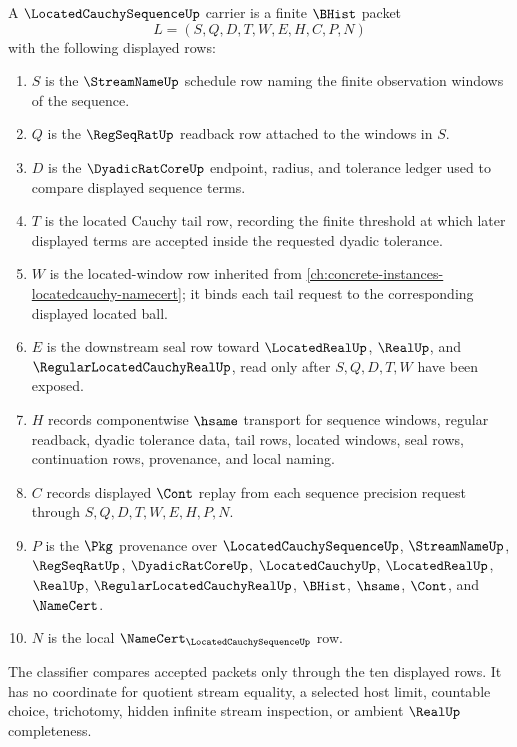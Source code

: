 \begin{definition}\label{def:located-cauchy-sequence-carrier}
A $\LocatedCauchySequenceUp$ carrier is a finite $\BHist$ packet
$$
L=(S,Q,D,T,W,E,H,C,P,N)
$$
with the following displayed rows:
\begin{enumerate}
\item $S$ is the $\StreamNameUp$ schedule row naming the finite observation windows of the sequence.
\item $Q$ is the $\RegSeqRatUp$ readback row attached to the windows in $S$.
\item $D$ is the $\DyadicRatCoreUp$ endpoint, radius, and tolerance ledger used to compare displayed sequence terms.
\item $T$ is the located Cauchy tail row, recording the finite threshold at which later displayed terms are accepted inside the requested dyadic tolerance.
\item $W$ is the located-window row inherited from \autoref{ch:concrete-instances-locatedcauchy-namecert}; it binds each tail request to the corresponding displayed located ball.
\item $E$ is the downstream seal row toward $\LocatedRealUp$, $\RealUp$, and $\RegularLocatedCauchyRealUp$, read only after $S,Q,D,T,W$ have been exposed.
\item $H$ records componentwise $\hsame$ transport for sequence windows, regular readback, dyadic tolerance data, tail rows, located windows, seal rows, continuation rows, provenance, and local naming.
\item $C$ records displayed $\Cont$ replay from each sequence precision request through $S,Q,D,T,W,E,H,P,N$.
\item $P$ is the $\Pkg$ provenance over $\LocatedCauchySequenceUp$, $\StreamNameUp$, $\RegSeqRatUp$, $\DyadicRatCoreUp$, $\LocatedCauchyUp$, $\LocatedRealUp$, $\RealUp$, $\RegularLocatedCauchyRealUp$, $\BHist$, $\hsame$, $\Cont$, and $\NameCert$.
\item $N$ is the local $\NameCert_{\LocatedCauchySequenceUp}$ row.
\end{enumerate}
The classifier compares accepted packets only through the ten displayed rows. It has no coordinate for quotient stream equality, a selected host limit, countable choice, trichotomy, hidden infinite stream inspection, or ambient $\RealUp$ completeness.
\end{definition}

